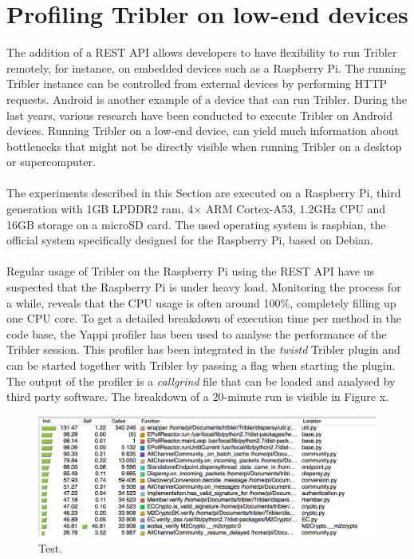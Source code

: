 \section{Profiling Tribler on low-end devices}
The addition of a REST API allows developers to have flexibility to run Tribler remotely, for instance, on embedded devices such as a Raspberry Pi. The running Tribler instance can be controlled from external devices by performing HTTP requests. Android is another example of a device that can run Tribler. During the last years, various research have been conducted to execute Tribler on Android devices. Running Tribler on a low-end device, can yield much information about bottlenecks that might not be directly visible when running Tribler on a desktop or supercomputer.\\\\
The experiments described in this Section are executed on a Raspberry Pi, third generation with 1GB LPDDR2 ram, 4× ARM Cortex-A53, 1.2GHz CPU and 16GB storage on a microSD card. The used operating system is raspbian, the official system specifically designed for the Raspberry Pi, based on Debian.\\\\
Regular usage of Tribler on the Raspberry Pi using the REST API have us suspected that the Raspberry Pi is under heavy load. Monitoring the process for a while, reveals that the CPU usage is often around 100\%, completely filling up one CPU core. To get a detailed breakdown of execution time per method in the code base, the Yappi profiler has been used to analyse the performance of the Tribler session. This profiler has been integrated in the \emph{twistd} Tribler plugin and can be started together with Tribler by passing a flag when starting the plugin. The output of the profiler is a \emph{callgrind} file that can be loaded and analysed by third party software. The breakdown of a 20-minute run is visible in Figure x.

\begin{figure}[!h]
	\centering
	\includegraphics[width=0.9\columnwidth]{images/experiments/yappi_breakdown}
	\caption{Test.}
	\label{fig:yappi_breakdown}
\end{figure}

